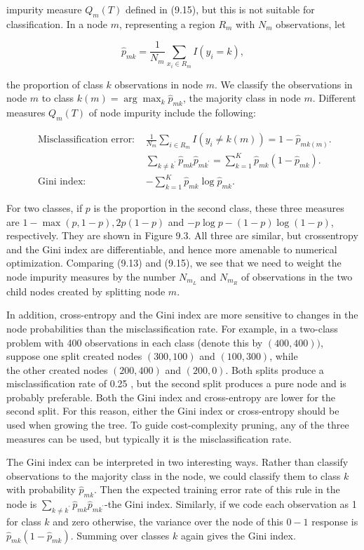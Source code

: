 \documentclass[10pt]{article}
\begin{document}
impurity measure $Q_{m}(T)$ defined in (9.15), but this is not suitable for classification. In a node $m$, representing a region $R_{m}$ with $N_{m}$ observations, let

$$
\hat{p}_{m k}=\frac{1}{N_{m}} \sum_{x_{i} \in R_{m}} I\left(y_{i}=k\right),
$$

the proportion of class $k$ observations in node $m$. We classify the observations in node $m$ to class $k(m)=\arg \max _{k} \hat{p}_{m k}$, the majority class in node $m$. Different measures $Q_{m}(T)$ of node impurity include the following:

$$
\begin{array}{ll}
\text { Misclassification error: } & \frac{1}{N_{m}} \sum_{i \in R_{m}} I\left(y_{i} \neq k(m)\right)=1-\hat{p}_{m k(m)} . \\
& \sum_{k \neq k^{\prime}} \hat{p}_{m k} \hat{p}_{m k^{\prime}}=\sum_{k=1}^{K} \hat{p}_{m k}\left(1-\hat{p}_{m k}\right) . \\
\text { Gini index: } & -\sum_{k=1}^{K} \hat{p}_{m k} \log \hat{p}_{m k} .
\end{array}
$$

For two classes, if $p$ is the proportion in the second class, these three measures are $1-\max (p, 1-p), 2 p(1-p)$ and $-p \log p-(1-p) \log (1-p)$, respectively. They are shown in Figure 9.3. All three are similar, but crossentropy and the Gini index are differentiable, and hence more amenable to numerical optimization. Comparing (9.13) and (9.15), we see that we need to weight the node impurity measures by the number $N_{m_{L}}$ and $N_{m_{R}}$ of observations in the two child nodes created by splitting node $m$.

In addition, cross-entropy and the Gini index are more sensitive to changes in the node probabilities than the misclassification rate. For example, in a two-class problem with 400 observations in each class (denote this by $(400,400))$, suppose one split created nodes $(300,100)$ and $(100,300)$, while\\
the other created nodes $(200,400)$ and $(200,0)$. Both splits produce a misclassification rate of 0.25 , but the second split produces a pure node and is probably preferable. Both the Gini index and cross-entropy are lower for the second split. For this reason, either the Gini index or cross-entropy should be used when growing the tree. To guide cost-complexity pruning, any of the three measures can be used, but typically it is the misclassification rate.

The Gini index can be interpreted in two interesting ways. Rather than classify observations to the majority class in the node, we could classify them to class $k$ with probability $\hat{p}_{m k}$. Then the expected training error rate of this rule in the node is $\sum_{k \neq k^{\prime}} \hat{p}_{m k} \hat{p}_{m k^{\prime}}$-the Gini index. Similarly, if we code each observation as 1 for class $k$ and zero otherwise, the variance over the node of this $0-1$ response is $\hat{p}_{m k}\left(1-\hat{p}_{m k}\right)$. Summing over classes $k$ again gives the Gini index.
\end{document}
